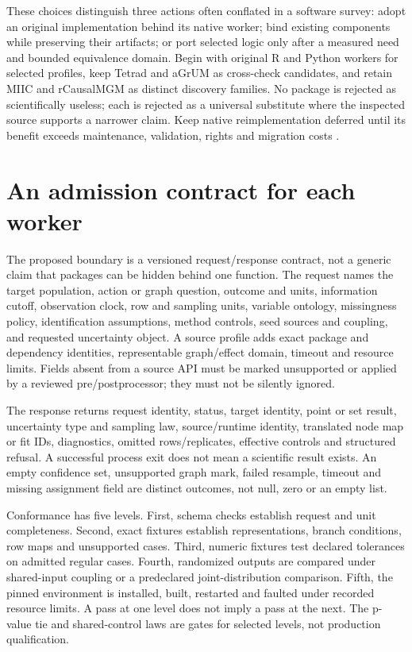 These choices distinguish three actions often conflated in a software survey:
adopt an original implementation behind its native worker; bind existing
components while preserving their artifacts; or port selected logic only after
a measured need and bounded equivalence domain. Begin with original R and
Python workers for selected profiles, keep Tetrad and aGrUM as cross-check
candidates, and retain MIIC and rCausalMGM as distinct discovery families. No
package is rejected as scientifically useless; each is rejected as a universal
substitute where the inspected source supports a narrower claim. Keep native
reimplementation deferred until its benefit exceeds maintenance, validation,
rights and migration costs \citep{exec17_s9_route_decisions}.

\section{An admission contract for each worker}

The proposed boundary is a versioned request/response contract, not a generic
claim that packages can be hidden behind one function. The request names the
target population, action or graph question, outcome and units, information
cutoff, observation clock, row and sampling units, variable ontology,
missingness policy, identification assumptions, method controls, seed sources
and coupling, and requested uncertainty object. A source profile adds exact
package and dependency identities, representable graph/effect domain, timeout
and resource limits. Fields absent from a source API must be marked unsupported
or applied by a reviewed pre/postprocessor; they must not be silently ignored.

The response returns request identity, status, target identity, point or set
result, uncertainty type and sampling law, source/runtime identity, translated
node map or fit IDs, diagnostics, omitted rows/replicates, effective controls
and structured refusal. A successful process exit does not mean a scientific
result exists. An empty confidence set, unsupported graph mark, failed
resample, timeout and missing assignment field are distinct outcomes, not null,
zero or an empty list.

Conformance has five levels. First, schema checks establish request and unit
completeness. Second, exact fixtures establish representations, branch
conditions, row maps and unsupported cases. Third, numeric fixtures test
declared tolerances on admitted regular cases. Fourth, randomized outputs are
compared under shared-input coupling or a predeclared joint-distribution
comparison. Fifth, the pinned environment is installed, built, restarted and
faulted under recorded resource limits. A pass at one level does not imply a
pass at the next. The p-value tie and shared-control laws are gates for selected
levels, not production qualification.

